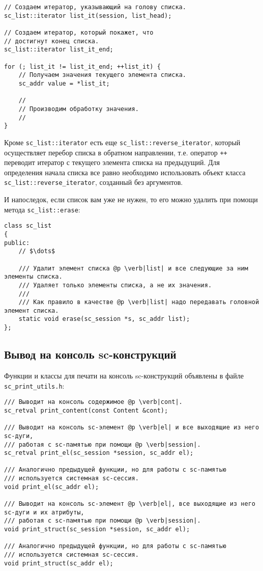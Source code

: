 \begin{lstlisting}[texcl]
// Создаем итератор, указывающий на голову списка.
sc_list::iterator list_it(session, list_head);

// Создаем итератор, который покажет, что
// достигнут конец списка.
sc_list::iterator list_it_end;

for (; list_it != list_it_end; ++list_it) {
    // Получаем значения текущего элемента списка.
    sc_addr value = *list_it;

    //
    // Производим обработку значения.
    //
}
\end{lstlisting}

Кроме \lstinline|sc_list::iterator| есть еще
\lstinline|sc_list::reverse_iterator|, который осуществляет перебор
списка в обратном направлении, т.е. оператор \lstinline|++| переводит
итератор с текущего элемента списка на предыдущий. Для определения
начала списка все равно необходимо использовать объект класса
\lstinline|sc_list::reverse_iterator|, созданный без аргументов.

И напоследок, если список вам уже не нужен, то его можно удалить при
помощи метода \lstinline|sc_list::erase|:

\begin{lstlisting}[texcl]
class sc_list
{
public:
    // $\dots$

    /// Удалит элемент списка @p \verb|list| и все следующие за ним элементы списка.
    /// Удаляет только элементы списка, а не их значения.
    ///
    /// Как правило в качестве @p \verb|list| надо передавать головной элемент списка.
    static void erase(sc_session *s, sc_addr list);
};
\end{lstlisting}

\subsection{Вывод на консоль sc-конструкций}
\label{sec:libsc_print}

Функции и классы для печати на консоль sc-конструкций объявлены в
файле \verb|sc_print_utils.h|:

\begin{lstlisting}[texcl]
/// Выводит на консоль содержимое @p \verb|cont|.
sc_retval print_content(const Content &cont);

/// Выводит на консоль sc-элемент @p \verb|el| и все выходящие из него sc-дуги,
/// работая с sc-памятью при помощи @p \verb|session|.
sc_retval print_el(sc_session *session, sc_addr el);

/// Аналогично предыдущей функции, но для работы с sc-памятью
/// используется системная sc-сессия.
void print_el(sc_addr el);

/// Выводит на консоль sc-элемент @p \verb|el|, все выходящие из него sc-дуги и их атрибуты,
/// работая с sc-памятью при помощи @p \verb|session|.
void print_struct(sc_session *session, sc_addr el);

/// Аналогично предыдущей функции, но для работы с sc-памятью
/// используется системная sc-сессия.
void print_struct(sc_addr el);
\end{lstlisting}


